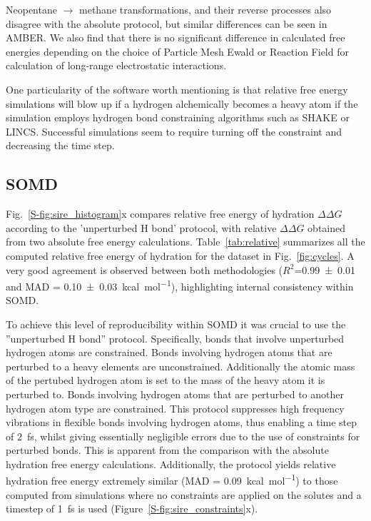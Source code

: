 \documentclass[journal=jctcce,manuscript=article]{achemso}
\begin{document}
Neopentane $\rightarrow$ methane transformations, and their reverse processes 
also disagree with the absolute protocol, but similar differences can be seen in AMBER.
We also find that there is no significant difference in calculated free energies depending on the choice of 
Particle Mesh Ewald or Reaction Field for calculation of long-range electrostatic interactions. 

One particularity of the software worth mentioning is 
that relative free energy simulations will blow up if a hydrogen alchemically becomes a heavy 
atom if the simulation employs hydrogen bond constraining algorithms such as SHAKE or LINCS.
Successful simulations seem to require turning off the constraint and decreasing the time step.

\subsection{SOMD}
\label{sec:somd-results}

Fig.~\ref{S-fig:sire_histogram}x compares relative free energy of hydration 
$\Delta\Delta G$ according to the 'unperturbed H bond' protocol, with relative 
$\Delta \Delta G$ obtained from two absolute free energy calculations. 
Table~\ref{tab:relative} summarizes all the computed relative free energy of 
hydration for the dataset in Fig.~\ref{fig:cycles}.
A very good agreement is observed between both methodologies 
($R^2$=\SI{0.99+-0.01}{} and MAD = \SI{0.10+-0.03}{kcal.mol^{-1}}), 
highlighting internal consistency within SOMD.

To achieve this level of reproducibility within SOMD it was crucial to use the
''unperturbed H bond'' protocol. Specifically, bonds that involve unperturbed 
hydrogen atoms are constrained. Bonds involving hydrogen atoms that are 
perturbed to a heavy elements are unconstrained.  Additionally the atomic mass 
of the pertubed hydrogen atom is set to the mass of the heavy atom it is 
perturbed to.  Bonds involving hydrogen atoms that are perturbed to another 
hydrogen atom type are constrained. This protocol suppresses high frequency 
vibrations in flexible bonds involving hydrogen atoms, thus enabling a time 
step of \SI{2}{fs}, whilst giving essentially negligible errors due to the use 
of constraints for perturbed bonds.  This is apparent from the comparison with 
the absolute hydration free energy calculations.  Additionally, the protocol 
yields relative hydration free energy extremely similar  (MAD = 
\SI{0.09}{kcal.mol^{-1}}) to those computed from simulations where no
constraints are applied on the solutes and a timestep of \SI{1}{fs} is
used (Figure~\ref{S-fig:sire_constraints}x).
\end{document}
